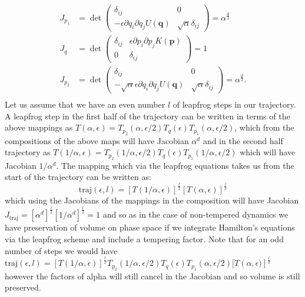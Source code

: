 \documentclass[12pt]{article}
\begin{document}
    \begin{align}
        J_{p_1} & = \det\begin{pmatrix} \delta_{ij} & 0 \\ -\epsilon\partial q_i \partial q_j U\left(\bm{q}\right) & \sqrt{\alpha}\delta_{ij} \end{pmatrix} = \alpha^\frac{d}{2} \\
        J_{q} & = \det\begin{pmatrix} \delta_{ij} & \epsilon\partial p_i \partial p_j K\left(\bm{p}\right) \\ 0 & \delta_{ij} \end{pmatrix} = 1 \\
        J_{p_2} & = \det\begin{pmatrix} \delta_{ij} & 0 \\ -\sqrt{\alpha}\epsilon\partial q_i \partial q_j U\left(\bm{q}\right) & \sqrt{\alpha}\delta_{ij} \end{pmatrix} = \alpha^\frac{d}{2}. \\
    \end{align}
    Let us assume that we have an even number $l$ of leapfrog steps in our trajectory. A leapfrog step in the first half of the trajectory can be written in terms of the above mappings as $T\left(\alpha,\epsilon\right) = T_{p_2}\left(\alpha,\epsilon/2\right)T_q\left(\epsilon\right)T_{p_1}\left(\alpha,\epsilon/2\right)$, which from the compositions of the above maps will have Jacobian $ \alpha^d $ and in the second half trajectory as $T\left(1/\alpha,\epsilon\right) = T_{p_2}\left(1/\alpha,\epsilon/2\right)T_q\left(\epsilon\right)T_{p_1}\left(1/\alpha,\epsilon/2\right)$ which will have Jacobian $1/\alpha^{d}$. The mapping which via the leapfrog equations takes us from the start of the trajectory can be written as:
    \begin{equation}
        \text{traj}\left(\epsilon,l\right)=\left[T\left(1/\alpha,\epsilon\right)\right]^{\frac{l}{2}}\left[T\left(\alpha,\epsilon\right)\right]^{\frac{l}{2}}
    \end{equation}
    which using the Jacobians of the mappings in the composition will have Jacobian $J_{\text{traj}}=\left[\alpha^d\right]^{\frac{l}{2}}\left[1/\alpha^d\right]^{\frac{l}{2}} = 1$ and so as in the case of non-tempered dynamics we have preservation of volume on phase space if we integrate Hamilton's equations via the leapfrog scheme and include a tempering factor. Note that for an odd number of steps we would have $\text{traj}\left(\epsilon,l\right)=\left[T\left(1/\alpha,\epsilon\right)\right]^{\frac{l}{2}} T_{p_2}\left(1/\alpha,\epsilon/2\right)T_q\left(\epsilon\right)T_{p_1}\left(\alpha,\epsilon/2\right)[T\left(\alpha,\epsilon)\right]^{\frac{l}{2}}$ however the factors of alpha will still cancel in the Jacobian and so volume is still preserved.
\end{document}
